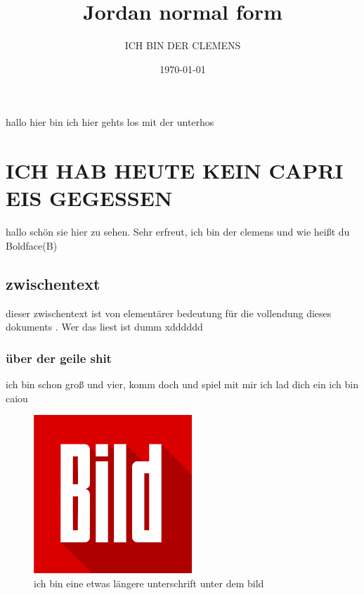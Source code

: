 \documentclass[a4paper]{scrartcl}
\title{Jordan normal form}
\author{ICH BIN DER CLEMENS}
\date{\today}
\begin{document}
	\maketitle
	\tableofcontents
	\newpage
	hallo hier bin ich
	hier gehts los mit der unterhos
		\section{ICH HAB HEUTE KEIN CAPRI EIS GEGESSEN}
			hallo schön sie hier zu sehen. Sehr erfreut, ich bin der clemens und wie heißt du
			Boldface(B)
			
			\subsection{zwischentext}
			dieser zwischentext ist von elementärer bedeutung für die vollendung dieses dokuments . Wer das liest ist dumm xdddddd
				\subsubsection{über der geile shit}
				ich bin schon groß und vier, komm doch und spiel mit mir ich lad dich ein ich bin\label{eins} caiou \vspace{40pt}
				
				\begin{figure}[h]
					\centering
					\includegraphics[width=0.7\linewidth]{download.png}
					\caption[ich bin eine sehr kurze unterschrift von dem bild]{ich bin eine etwas längere unterschrift unter dem bild}
					\label{fig:wallpaper}
				\end{figure}
				\pagebreak
				
\end{document}
